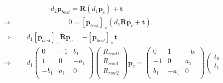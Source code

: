 \documentclass{article}
\begin{document}
\begin{CJK*}{GBK}{song}
\begin{equation}\left.
\begin{aligned}\\&
\qquad\qquad\qquad\qquad\qquad\quad{d}_2\boldsymbol{p}_{best}=\boldsymbol{R}({d}_1\boldsymbol{p}_{c})+\boldsymbol{t}
\\&
\qquad\qquad\Rightarrow\qquad\qquad\qquad\qquad 0=[\boldsymbol{p}_{best}]_{\times}({d}_1\boldsymbol{R}\boldsymbol{p}_{c}+\boldsymbol{t})
\\&
\qquad\qquad\Rightarrow\qquad{d}_1[\boldsymbol{p}_{best}]_{\times}\boldsymbol{R}\boldsymbol{p}_{c}=-[\boldsymbol{p}_{best}]_{\times}\boldsymbol{t}
\\&
\qquad\qquad\Rightarrow\qquad{d}_1\left(
                              \begin{array}{ccc}
                                0      & -1     & b_{1} \\
                                1      & 0      & -a_{1} \\
                                -b_{1} & a_{1}  & 0      \\
                              \end{array}
                            \right)
                            \left(
                              \begin{array}{c}
                                R_{row0} \\
                                R_{row1} \\
                                R_{row2} \\
                              \end{array}
                            \right)
                            \boldsymbol{p}_{c}
                            =\left(
                              \begin{array}{ccc}
                                0      & 1     & -b_{1} \\
                                -1      & 0      & a_{1} \\
                                b_{1} & -a_{1}  & 0      \\
                              \end{array}
                            \right)
                            \left(
                              \begin{array}{c}
                                t_{0} \\
                                t_{1} \\

\end{array}
\end{aligned}
\end{equation}
\end{CJK*}
\end{document}
